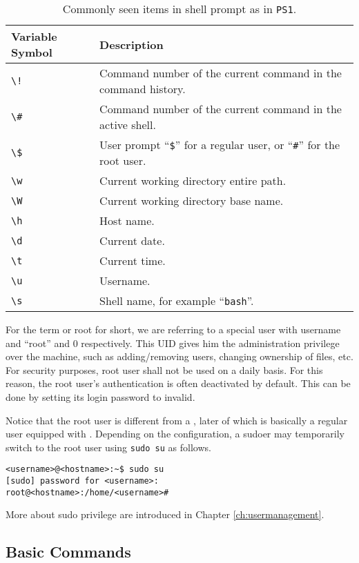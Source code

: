 \begin{table}
	\centering \caption{Commonly seen items in shell prompt as in \texttt{PS1}.}\label{ch:sb:tab:promptvariable}
	\begin{tabularx}{\textwidth}{lX}
		\hline
		Variable Symbol & Description \\ \hline
		\verb|\!| & Command number of the current command in the command history. \\ 
		\verb|\#| & Command number of the current command in the active shell. \\ 
		\verb|\$| & User prompt ``\verb|$|'' for a regular user, or ``\verb|#|'' for the root user. \\
		\verb|\w| & Current working directory entire path. \\ 
		\verb|\W| & Current working directory base name. \\ 
		\verb|\h| & Host name. \\ 
		\verb|\d| & Current date. \\ 
		\verb|\t| & Current time. \\ 
		\verb|\u| & Username. \\ 
		\verb|\s| & Shell name, for example ``\verb|bash|''. \\ 
		\hline
	\end{tabularx}
\end{table}

For the term  or root for short, we are referring to a special user with username and  ``root'' and 0 respectively. This UID gives him the administration privilege over the machine, such as adding/removing users, changing ownership of files, etc. For security purposes, root user shall not be used on a daily basis. For this reason, the root user's authentication is often deactivated by default. This can be done by setting its login password to invalid.

Notice that the root user is different from a , later of which is basically a regular user equipped with . Depending on the configuration, a sudoer may temporarily switch to the root user using \verb|sudo su| as follows.
\begin{lstlisting}
<username>@<hostname>:~$ sudo su
[sudo] password for <username>:
root@<hostname>:/home/<username>#
\end{lstlisting}
More about sudo privilege are introduced in Chapter \ref{ch:usermanagement}.

\subsection{Basic Commands}

